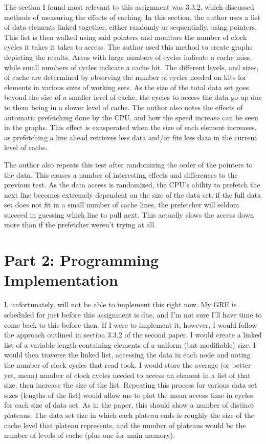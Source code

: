 \documentclass[letterpaper,10pt,titlepage]{article}
\begin{document}
The section I found most relevant to this assignment was 3.3.2, which discussed methods of measuring the effects of caching.
In this section, the author uses a list of data elements linked together, either randomly or sequentially, using pointers.
This list is then walked using said pointers and monitors the number of clock cycles it takes it takes to access.
The author used this method to create graphs depicting the results.
Areas with large numbers of cycles indicate a cache miss, while small numbers of cycles indicate a cache hit.
The different levels, and sizes, of cache are determined by observing the number of cycles needed on hits for elements in various sizes of working sets.
As the size of the total data set goes beyond the size of a smaller level of cache, the cycles to access the data go up due to them being in a slower level of cache.
The author also notes the effects of automatic prefetching done by the CPU, and how the speed increase can be seen in the graphs.
This effect is exasperated when the size of each element increases, as prefetching a line ahead retrieves less data and/or fits less data in the current level of cache.

The author also repeats this test after randomizing the order of the pointers to the data.
This causes a number of interesting effects and differences to the previous test.
As the data access is randomized, the CPU's ability to prefetch the next line becomes extremely dependent on the size of the data set;
if the full data set does not fit in a small number of cache lines, the prefetcher will seldom succeed in guessing which line to pull next.
This actually slows the access down more than if the prefetcher weren't trying at all.

\section*{Part 2: Programming Implementation}

I, unfortunately, will not be able to implement this right now. 
My GRE is scheduled for just before this assignment is due, and I'm not sure I'll have time to come back to this before then.
If I were to implement it, however, I would follow the approach outlined in section 3.3.2 of the second paper.
I would create a linked list of a variable length containing elements of a uniform (but modifiable) size.
I would then traverse the linked list, accessing the data in each node and noting the number of clock cycles that read took.
I would store the average (or better yet, mean) number of clock cycles needed to access an element in a list of that size, then increase the size of the list.
Repeating this process for various data set sizes (lengths of the list) would allow me to plot the mean access time in cycles for each size of data set.
As in the paper, this should show a number of distinct plateaus.
The data set size in which each plateau ends is roughly the size of the cache level that plateau represents, and the number of plateaus would be the number of levels of cache (plus one for main memory).
\end{document}
